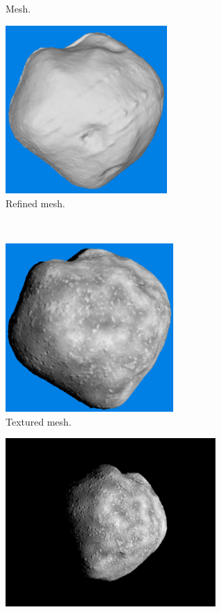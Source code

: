 \begin{figure}[htb]
\begin{subfigure}[b]{0.46\textwidth}
        \caption{Mesh.}
        \label{fig:recon_step_mesh}
    \end{subfigure}
    \begin{subfigure}[b]{0.46\textwidth}
        \centering
        \includegraphics[width=\textwidth,height=6.4cm]{doc/thesis/0_figures/models_quality/100_1/120_100_1_refine2.png}
        \caption{Refined mesh.}
        \label{fig:recon_step_refine}
    \end{subfigure}
    \\
    \begin{subfigure}[b]{0.46\textwidth}
        \centering
        \includegraphics[width=\textwidth,height=6.4cm]{doc/thesis/0_figures/models_quality/100_1/120_100_1_texture1.png}
        \caption{Textured mesh.}
        \label{fig:recon_step_texture}
    \end{subfigure}
    \begin{subfigure}[b]{0.46\textwidth}
        \centering
        \includegraphics[width=\textwidth,height=6.4cm]{doc/thesis/0_figures/models_quality/100_1/120_100_1_img1.png}

\end{subfigure}
\end{figure}
